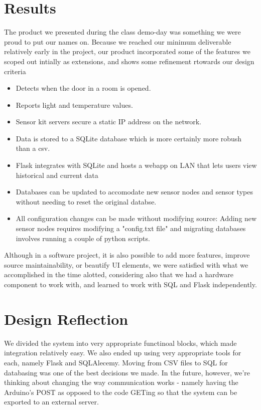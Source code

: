 \documentclass{article}
\begin{document}
\section*{Results}
\par The product we presented during the class demo-day was something we were proud to put our names on. Because we reached our minimum deliverable relatively early in the project, our product incorporated some of the features we scoped out intially as extensions, and shows some refinement rtowards our design criteria
\begin{itemize}
 \item Detects when the door in a room is opened.
 \item Reports light and temperature values.
 \item Sensor kit servers secure a static IP address on the network.
 \item Data is stored to a SQLite database which is more certainly more robush than a csv.
 \item Flask integrates with SQLite and hosts a webapp on LAN that lets users view historical and current data
 \item Databases can be updated to accomodate new sensor nodes and sensor types without needing to reset the original databse.
 \item All configuration changes can be made without modifying source: Adding new sensor nodes requires modifying a "config.txt file" and migrating databases involves running a couple of python scripts.
\end{itemize}
Although in a software project, it is also possible to add more features, improve source maintainability, or beautify UI elements, we were satisfied with what we accomplished in the time alotted, considering also that we had a hardware component to work with, and learned to work with SQL and Flask independently.

\section*{Design Reflection}
\par We divided the system into very appropriate functinoal blocks, which made integration relatively easy.  We also ended up using very appropriate tools for each, namely Flask and SQLAlecemy.  Moving from CSV files to SQL for databasing was one of the best decisions we made.  In the future, however, we're thinking about changing the way communication works - namely having the Arduino's POST as opposed to the code GETing so that the system can be exported to an external server.
\end{document}
